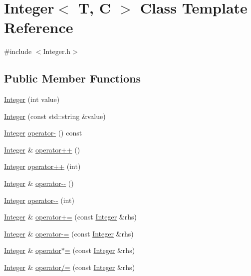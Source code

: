 \hypertarget{class_integer}{\section{Integer$<$ T, C $>$ Class Template Reference}
\label{class_integer}
}


{\ttfamily \#include $<$Integer.\-h$>$}

\subsection*{Public Member Functions}
\begin{DoxyCompactItemize}
\item 
\hyperlink{class_integer_a1d5315e4ec5b56b8cb3a6991d514f7d6}{Integer} (int value)
\item 
\hyperlink{class_integer_afebf72d47413ceedcc30b74c3055b771}{Integer} (const std\-::string \&value)
\item 
\hyperlink{class_integer}{Integer} \hyperlink{class_integer_ae9d1fb575b55ac2f6352a2d735c4bb75}{operator-\/} () const 
\item 
\hyperlink{class_integer}{Integer} \& \hyperlink{class_integer_a3fc47ae07dce44aa72ce9e02b9a3e003}{operator++} ()
\item 
\hyperlink{class_integer}{Integer} \hyperlink{class_integer_a326d5bd7d72ad858f523bed95ae66150}{operator++} (int)
\item 
\hyperlink{class_integer}{Integer} \& \hyperlink{class_integer_ac6227ea2b4a75ff08d537db0d3a26be4}{operator-\/-\/} ()
\item 
\hyperlink{class_integer}{Integer} \hyperlink{class_integer_ae5b697679221dbf1fbc942335bb19fb4}{operator-\/-\/} (int)
\item 
\hyperlink{class_integer}{Integer} \& \hyperlink{class_integer_a0c37e366a26b17cfd73b1b29a1e8b47b}{operator+=} (const \hyperlink{class_integer}{Integer} \&rhs)
\item 
\hyperlink{class_integer}{Integer} \& \hyperlink{class_integer_a2bff1e6dc8f6990028783da8bdd89b0d}{operator-\/=} (const \hyperlink{class_integer}{Integer} \&rhs)
\item 
\hyperlink{class_integer}{Integer} \& \hyperlink{class_integer_acf1388dc4ce49c9b7d69b3b6c3a245f7}{operator$\ast$=} (const \hyperlink{class_integer}{Integer} \&rhs)
\item 
\hyperlink{class_integer}{Integer} \& \hyperlink{class_integer_aa13c715bbc68c58c2bd1f1b49a80277e}{operator/=} (const \hyperlink{class_integer}{Integer} \&rhs)

\end{DoxyCompactItemize}
